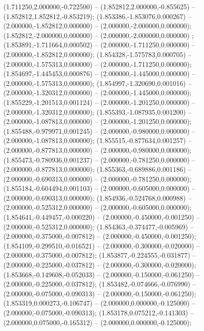  (1.711250,2.000000,-0.722500) -- (1.852812,2.000000,-0.855625) -- (1.852812,1.852812,-0.853219);
 (1.853386,-1.853076,0.000267) -- (2.000000,-1.852812,0.000000) -- (2.000000,-2.000000,0.000000);
 (1.852812,-2.000000,0.000000) -- (2.000000,-2.000000,0.000000) ;
 (1.853891,-1.711664,0.000502) -- (2.000000,-1.711250,0.000000) -- (2.000000,-1.852812,0.000000);
 (1.854328,-1.575783,0.000705) -- (2.000000,-1.575313,0.000000) -- (2.000000,-1.711250,0.000000);
 (1.854697,-1.445453,0.000876) -- (2.000000,-1.445000,0.000000) -- (2.000000,-1.575313,0.000000);
 (1.854997,-1.320690,0.001016) -- (2.000000,-1.320312,0.000000) -- (2.000000,-1.445000,0.000000);
 (1.855229,-1.201513,0.001124) -- (2.000000,-1.201250,0.000000) -- (2.000000,-1.320312,0.000000);
 (1.855393,-1.087935,0.001200) -- (2.000000,-1.087813,0.000000) -- (2.000000,-1.201250,0.000000);
 (1.855488,-0.979971,0.001245) -- (2.000000,-0.980000,0.000000) -- (2.000000,-1.087813,0.000000);
 (1.855515,-0.877634,0.001257) -- (2.000000,-0.877813,0.000000) -- (2.000000,-0.980000,0.000000);
 (1.855473,-0.780936,0.001237) -- (2.000000,-0.781250,0.000000) -- (2.000000,-0.877813,0.000000);
 (1.855363,-0.689886,0.001186) -- (2.000000,-0.690313,0.000000) -- (2.000000,-0.781250,0.000000);
 (1.855184,-0.604494,0.001103) -- (2.000000,-0.605000,0.000000) -- (2.000000,-0.690313,0.000000);
 (1.854936,-0.524768,0.000988) -- (2.000000,-0.525312,0.000000) -- (2.000000,-0.605000,0.000000);
 (1.854641,-0.449457,-0.000220) -- (2.000000,-0.450000,-0.001250) -- (2.000000,-0.525312,0.000000);
 (1.854363,-0.374477,-0.005969) -- (2.000000,-0.375000,-0.007812) -- (2.000000,-0.450000,-0.001250);
 (1.854109,-0.299510,-0.016521) -- (2.000000,-0.300000,-0.020000) -- (2.000000,-0.375000,-0.007812);
 (1.853877,-0.224555,-0.031877) -- (2.000000,-0.225000,-0.037812) -- (2.000000,-0.300000,-0.020000);
 (1.853668,-0.149608,-0.052033) -- (2.000000,-0.150000,-0.061250) -- (2.000000,-0.225000,-0.037812);
 (1.853482,-0.074666,-0.076990) -- (2.000000,-0.075000,-0.090313) -- (2.000000,-0.150000,-0.061250);
 (1.853319,0.000273,-0.106747) -- (2.000000,0.000000,-0.125000) -- (2.000000,-0.075000,-0.090313);
 (1.853178,0.075212,-0.141303) -- (2.000000,0.075000,-0.165312) -- (2.000000,0.000000,-0.125000);
